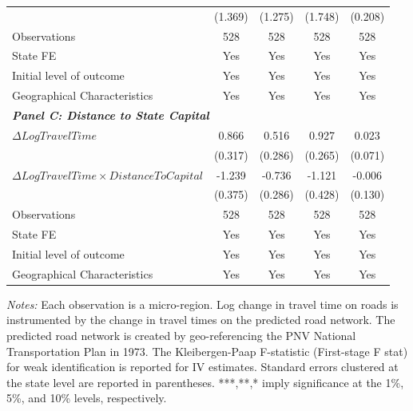 \begin{table}[p]
{{\begin{tabular}{l*{4}{c}}
&     (1.369)         &     (1.275)         &     (1.748)         &     (0.208)         \\
Observations        &         528         &         528         &         528         &         528         \\
State FE            &         Yes         &         Yes         &         Yes         &         Yes         \\
Initial level of outcome&         Yes         &         Yes         &         Yes         &         Yes         \\
Geographical Characteristics&         Yes         &         Yes         &         Yes         &         Yes         \\
\hline
\multicolumn{4}{l}{\linebreak \textbf{\textit{Panel C: Distance to State Capital}}} \\
$\Delta Log Travel Time$&       0.866\sym{**} &       0.516\sym{*}  &       0.927\sym{***}&       0.023         \\
&     (0.317)         &     (0.286)         &     (0.265)         &     (0.071)         \\
$\Delta Log Travel Time \times Distance To Capital$&      -1.239\sym{***}&      -0.736\sym{**} &      -1.121\sym{**} &      -0.006         \\
&     (0.375)         &     (0.286)         &     (0.428)         &     (0.130)         \\
Observations        &         528         &         528         &         528         &         528         \\
State FE            &         Yes         &         Yes         &         Yes         &         Yes         \\
Initial level of outcome&         Yes         &         Yes         &         Yes         &         Yes         \\
Geographical Characteristics&         Yes         &         Yes         &         Yes         &         Yes         \\
\hline\hline
\end{tabular}}
}
\usebox{\tabbox}
\begin{minipage}{\wd\tabbox}
    \vspace{0.1cm}
    {\footnotesize \sloppy \textit{Notes: } Each observation is a micro-region. Log change in travel time on roads is instrumented by the change in travel times on the predicted road network. The predicted road network is created by geo-referencing the PNV National Transportation Plan in 1973. The Kleibergen-Paap F-statistic (First-stage F stat) for weak identification is reported for IV estimates. Standard errors clustered at the state level are reported in parentheses. ***,**,* imply significance at the 1\%, 5\%, and 10\% levels, respectively.}
\end{minipage}
\endgroup
\end{table}
